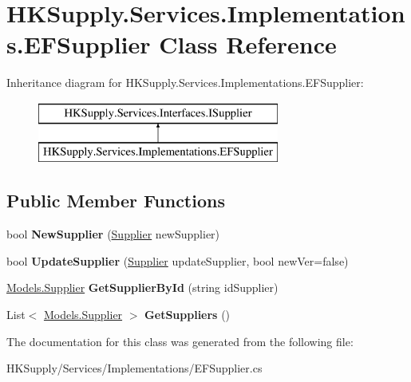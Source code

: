 \hypertarget{class_h_k_supply_1_1_services_1_1_implementations_1_1_e_f_supplier}{}\section{H\+K\+Supply.\+Services.\+Implementations.\+E\+F\+Supplier Class Reference}
\label{class_h_k_supply_1_1_services_1_1_implementations_1_1_e_f_supplier}
Inheritance diagram for H\+K\+Supply.\+Services.\+Implementations.\+E\+F\+Supplier\+:\begin{figure}[H]
\begin{center}
\leavevmode
\includegraphics[height=2.000000cm]{class_h_k_supply_1_1_services_1_1_implementations_1_1_e_f_supplier}
\end{center}
\end{figure}
\subsection*{Public Member Functions}
\begin{DoxyCompactItemize}
\item 
\mbox{\label{class_h_k_supply_1_1_services_1_1_implementations_1_1_e_f_supplier_ac6007f14e02bd817674f4a67058a0d56}} 
bool {\bfseries New\+Supplier} (\hyperlink{class_h_k_supply_1_1_models_1_1_supplier}{Supplier} new\+Supplier)
\item 
\mbox{\label{class_h_k_supply_1_1_services_1_1_implementations_1_1_e_f_supplier_aa4fb3668e36d6d76e84840be157e3632}} 
bool {\bfseries Update\+Supplier} (\hyperlink{class_h_k_supply_1_1_models_1_1_supplier}{Supplier} update\+Supplier, bool new\+Ver=false)
\item 
\mbox{\label{class_h_k_supply_1_1_services_1_1_implementations_1_1_e_f_supplier_a302b3d6f8fed58b7f804cd645a513384}} 
\hyperlink{class_h_k_supply_1_1_models_1_1_supplier}{Models.\+Supplier} {\bfseries Get\+Supplier\+By\+Id} (string id\+Supplier)
\item 
\mbox{\label{class_h_k_supply_1_1_services_1_1_implementations_1_1_e_f_supplier_a9881ab8326a00f150795c812b0d909db}} 
List$<$ \hyperlink{class_h_k_supply_1_1_models_1_1_supplier}{Models.\+Supplier} $>$ {\bfseries Get\+Suppliers} ()
\end{DoxyCompactItemize}


The documentation for this class was generated from the following file\+:\begin{DoxyCompactItemize}
\item 
H\+K\+Supply/\+Services/\+Implementations/E\+F\+Supplier.\+cs\end{DoxyCompactItemize}
